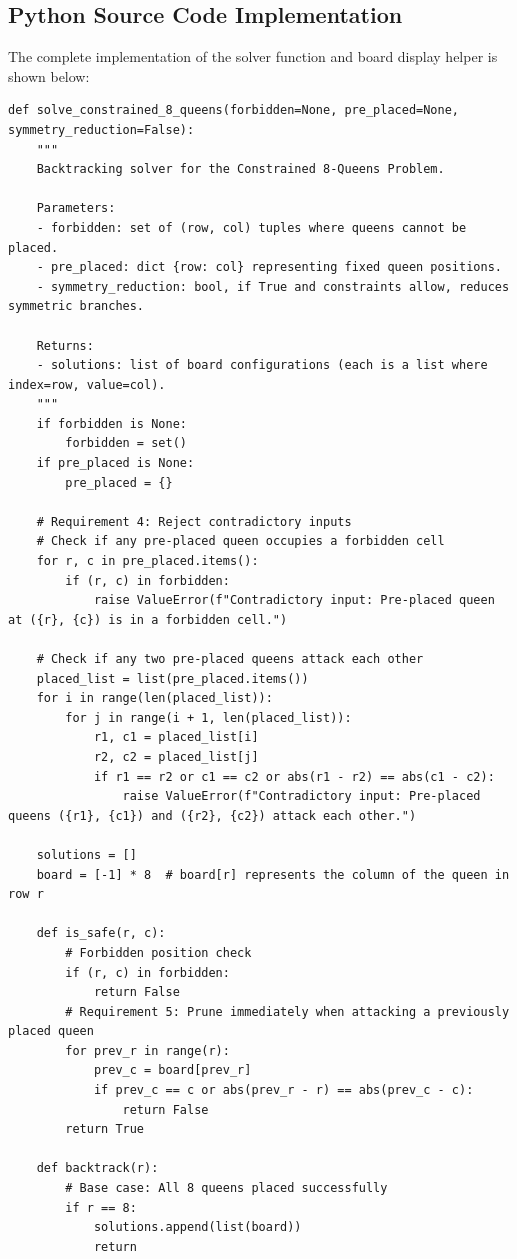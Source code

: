 \documentclass[12pt]{article}
\begin{document}
\subsection{Python Source Code Implementation}
The complete implementation of the solver function and board display helper is shown below:

\begin{lstlisting}[style=code]
def solve_constrained_8_queens(forbidden=None, pre_placed=None, symmetry_reduction=False):
    """
    Backtracking solver for the Constrained 8-Queens Problem.
    
    Parameters:
    - forbidden: set of (row, col) tuples where queens cannot be placed.
    - pre_placed: dict {row: col} representing fixed queen positions.
    - symmetry_reduction: bool, if True and constraints allow, reduces symmetric branches.
    
    Returns:
    - solutions: list of board configurations (each is a list where index=row, value=col).
    """
    if forbidden is None:
        forbidden = set()
    if pre_placed is None:
        pre_placed = {}

    # Requirement 4: Reject contradictory inputs
    # Check if any pre-placed queen occupies a forbidden cell
    for r, c in pre_placed.items():
        if (r, c) in forbidden:
            raise ValueError(f"Contradictory input: Pre-placed queen at ({r}, {c}) is in a forbidden cell.")

    # Check if any two pre-placed queens attack each other
    placed_list = list(pre_placed.items())
    for i in range(len(placed_list)):
        for j in range(i + 1, len(placed_list)):
            r1, c1 = placed_list[i]
            r2, c2 = placed_list[j]
            if r1 == r2 or c1 == c2 or abs(r1 - r2) == abs(c1 - c2):
                raise ValueError(f"Contradictory input: Pre-placed queens ({r1}, {c1}) and ({r2}, {c2}) attack each other.")

    solutions = []
    board = [-1] * 8  # board[r] represents the column of the queen in row r

    def is_safe(r, c):
        # Forbidden position check
        if (r, c) in forbidden:
            return False
        # Requirement 5: Prune immediately when attacking a previously placed queen
        for prev_r in range(r):
            prev_c = board[prev_r]
            if prev_c == c or abs(prev_r - r) == abs(prev_c - c):
                return False
        return True

    def backtrack(r):
        # Base case: All 8 queens placed successfully
        if r == 8:
            solutions.append(list(board))
            return


\end{lstlisting}
\end{document}
